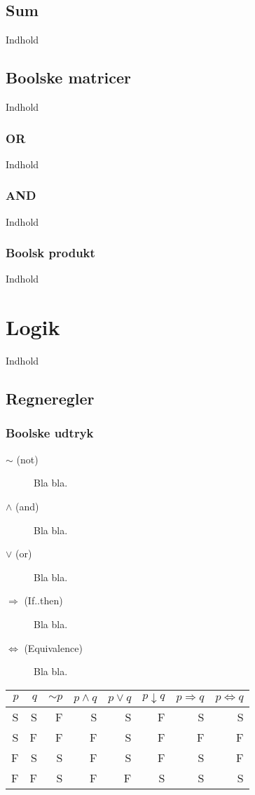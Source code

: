 \documentclass{article}
\begin{document}
  \subsection{Sum}
    Indhold
  \subsection{Boolske matricer}
    Indhold
    \subsubsection{OR}
      Indhold
    \subsubsection{AND}
      Indhold
    \subsubsection{Boolsk produkt}
      Indhold
\section{Logik}
  Indhold
  \subsection{Regneregler}
    \subsubsection{Boolske udtryk}
      \begin{description}
        \item[$\sim$ (not)] Bla bla.
        \item[$\wedge$ (and)] Bla bla.
        \item[$\vee$ (or)]  Bla bla.
        \item[$\Rightarrow$ (If..then)]  Bla bla.
        \item[$\Leftrightarrow$ (Equivalence)]  Bla bla.
      \end{description}
      \begin{center}
        \begin{tabular} {|r|r||r|r|r|r|r|r|}
          \hline
          $p$ & $q$  & $\sim{}p$ &  $p\wedge{}q$ &  $p\vee{}q$ &  $p\downarrow{}q$  &  $p\Rightarrow{}q$  &  $p\Leftrightarrow{}q$ \\
          \hline
          \hline
          S&S&F&S&S&F&S&S\\
          \hline
          S&F&F&F&S&F&F&F\\
          \hline
          F&S&S&F&S&F&S&F\\
          \hline
          F&F&S&F&F&S&S&S\\
          \hline
        \end{tabular}
      \end{center}
\end{document}
